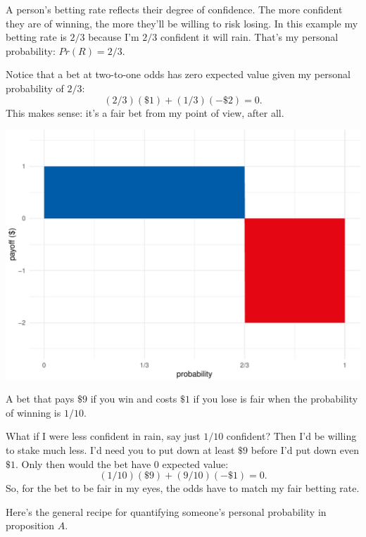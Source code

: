 \documentclass[justified]{tufte-book}
\newcommand{\p}{Pr}
\theoremstyle{definition}
\theoremstyle{definition}
\theoremstyle{definition}
\theoremstyle{definition}
\theoremstyle{remark}
\begin{document}
A person's betting rate reflects their degree of confidence. The more confident they are of winning, the more they'll be willing to risk losing. In this example my betting rate is \(2/3\) because I'm \(2/3\) confident it will rain. That's my personal probability: \(\p(R) = 2/3\).

Notice that a bet at two-to-one odds has zero expected value given my personal probability of \(2/3\):
\[ (2/3)(\$1) + (1/3)(-\$2) = 0. \]
This makes sense: it's a fair bet from my point of view, after all.

\begin{marginfigure}
\includegraphics{_main_files/figure-latex/unnamed-chunk-123-1} \caption[A bet that pays $\$9$ if you win and costs $\$1$ if you lose is fair when the probability of winning is $1/10$]{A bet that pays $\$9$ if you win and costs $\$1$ if you lose is fair when the probability of winning is $1/10$.}\label{fig:unnamed-chunk-123}
\end{marginfigure}

What if I were less confident in rain, say just \(1/10\) confident? Then I'd be willing to stake much less. I'd need you to put down at least \(\$9\) before I'd put down even \(\$1\). Only then would the bet have \(0\) expected value:
\[ (1/10)(\$9) + (9/10)(-\$1) = 0. \]
So, for the bet to be fair in my eyes, the odds have to match my fair betting rate.

Here's the general recipe for quantifying someone's personal probability in proposition \(A\).
\end{document}
